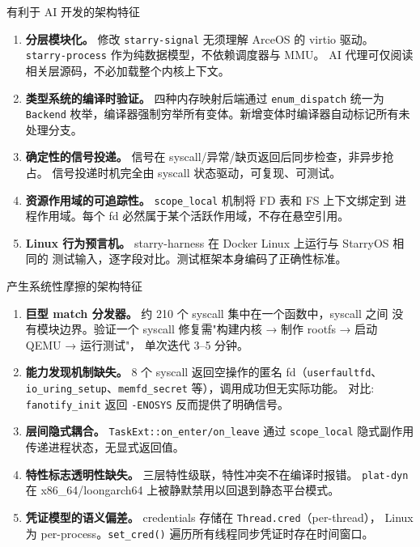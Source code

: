 \documentclass[aspectratio=169,10pt]{ctexbeamer}
\begin{document}
\begin{frame}[shrink=15]{有利于 AI 开发的架构特征}
\begin{enumerate}
  \item \textbf{分层模块化。} 修改 \texttt{starry-signal} 无须理解 ArceOS 的 virtio 驱动。
    \texttt{starry-process} 作为纯数据模型，不依赖调度器与 MMU。
    AI 代理可仅阅读相关层源码，不必加载整个内核上下文。

  \item \textbf{类型系统的编译时验证。} 四种内存映射后端通过 \texttt{enum\_dispatch} 统一为
    \texttt{Backend} 枚举，编译器强制穷举所有变体。新增变体时编译器自动标记所有未处理分支。

  \item \textbf{确定性的信号投递。} 信号在 syscall/异常/缺页返回后同步检查，非异步抢占。
    信号投递时机完全由 syscall 状态驱动，可复现、可测试。

  \item \textbf{资源作用域的可追踪性。} \texttt{scope\_local} 机制将 FD 表和 FS 上下文绑定到
    进程作用域。每个 fd 必然属于某个活跃作用域，不存在悬空引用。

  \item \textbf{Linux 行为预言机。} starry-harness 在 Docker Linux 上运行与 StarryOS 相同的
    测试输入，逐字段对比。测试框架本身编码了正确性标准。
\end{enumerate}
\end{frame}


\begin{frame}[shrink=10]{产生系统性摩擦的架构特征}
\begin{enumerate}
  \item \textbf{巨型 match 分发器。} 约 210 个 syscall 集中在一个函数中，syscall 之间
    没有模块边界。验证一个 syscall 修复需"构建内核 → 制作 rootfs → 启动 QEMU → 运行测试"，
    单次迭代 3--5 分钟。

  \item \textbf{能力发现机制缺失。} 8 个 syscall 返回空操作的匿名 fd（\texttt{userfaultfd}、
    \texttt{io\_uring\_setup}、\texttt{memfd\_secret} 等），调用成功但无实际功能。
    对比: \texttt{fanotify\_init} 返回 \texttt{-ENOSYS} 反而提供了明确信号。

  \item \textbf{层间隐式耦合。} \texttt{TaskExt::on\_enter/on\_leave} 通过 \texttt{scope\_local}
    隐式副作用传递进程状态，无显式返回值。

  \item \textbf{特性标志透明性缺失。} 三层特性级联，特性冲突不在编译时报错。
    \texttt{plat-dyn} 在 x86\_64/loongarch64 上被静默禁用以回退到静态平台模式。

  \item \textbf{凭证模型的语义偏差。} credentials 存储在 \texttt{Thread.cred}（per-thread），
    Linux 为 per-process。\texttt{set\_cred()} 遍历所有线程同步凭证时存在时间窗口。
\end{enumerate}
\end{frame}
\end{document}
